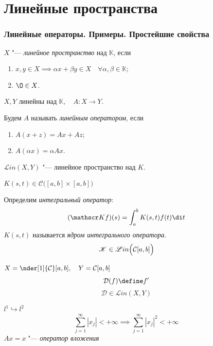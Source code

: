 \part{Линейные пространства}

\section{Линейные операторы.
Примеры.
Простейшие свойства}

\begin{definition}
	$ X $ "--- \emph{линейное пространство} над $ \mathbb K $, если
	\begin{enumerate}
		\item $ x, y \in X \implies \alpha x + \beta y \in X \quad
			\forall \alpha, \beta \in \mathbb K $;
		\item $ \O \in X $.
	\end{enumerate}
\end{definition}

\begin{definition}
	$ X, Y $ линейны над $ \mathbb K, \quad A : X \to Y $.

	Будем $ A $ называть \emph{линейным оператором}, если
	\begin{enumerate}
		\item $ A(x + z) = Ax + Az $;
		\item $ A(\alpha x) = \alpha Ax $.
	\end{enumerate}
\end{definition}

\begin{remark}
	$ \mathscr Lin(X, Y) $ "--- линейное пространство над $ K $.
\end{remark}

\begin{exmpls}
\item $ K(s, t) \in \mathcal C \bigl( [a, b] \times [a, b]\bigr) $

	Определим \emph{интегральный оператор}:
	$$ ( \mathscr K f)(s) = \int_a^b K(s, t) f(t) \di t $$
	$ K(s, t) $ называется \emph{ядром интегрального оператора}.
	$$ \mathscr K \in \mathscr Lin \Bigl( \mathcal C[a, b] \Bigr) $$
\item $ X = \nder[1]{\mathcal C}[a, b], \quad Y = \mathcal C[a, b] $
	$$ \mathcal D(f) \define f' $$
	$$ \mathcal D \in \mathscr Lin (X, Y) $$
\item $ l^1 \hookrightarrow l^2 $
	$$ \sum_{j = 1}^\infty |x_j| < +\infty \implies \sum_{j = 1}^\infty |x_j|^2 < +\infty $$
	$ Ax = x $ "--- \emph{оператор вложения}
\end{exmpls}

